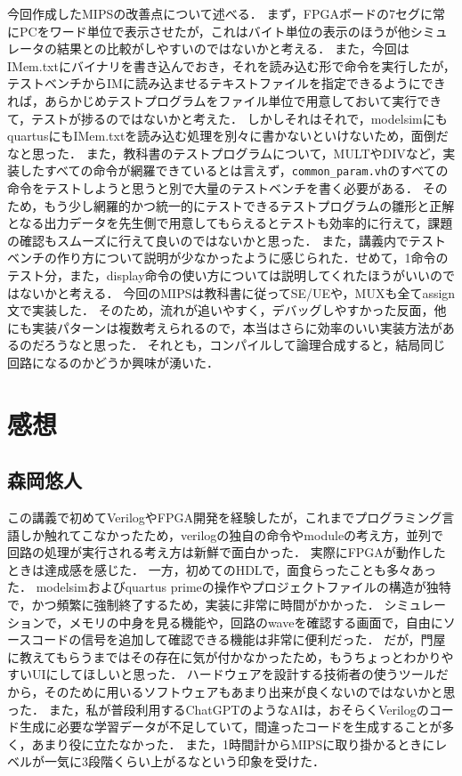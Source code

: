 \documentclass[dvipdfmx]{jsarticle}
\begin{document}
今回作成したMIPSの改善点について述べる．
まず，FPGAボードの7セグに常にPCをワード単位で表示させたが，これはバイト単位の表示のほうが他シミュレータの結果との比較がしやすいのではないかと考える．
また，今回はIMem.txtにバイナリを書き込んでおき，それを読み込む形で命令を実行したが，テストベンチからIMに読み込ませるテキストファイルを指定できるようにできれば，あらかじめテストプログラムをファイル単位で用意しておいて実行できて，テストが捗るのではないかと考えた．
しかしそれはそれで，modelsimにもquartusにもIMem.txtを読み込む処理を別々に書かないといけないため，面倒だなと思った．
また，教科書のテストプログラムについて，MULTやDIVなど，実装したすべての命令が網羅できているとは言えず，\texttt{common_param.vh}のすべての命令をテストしようと思うと別で大量のテストベンチを書く必要がある．
そのため，もう少し網羅的かつ統一的にテストできるテストプログラムの雛形と正解となる出力データを先生側で用意してもらえるとテストも効率的に行えて，課題の確認もスムーズに行えて良いのではないかと思った．
また，講義内でテストベンチの作り方について説明が少なかったように感じられた．せめて，1命令のテスト分，また，display命令の使い方については説明してくれたほうがいいのではないかと考える．
今回のMIPSは教科書に従ってSE/UEや，MUXも全てassign文で実装した．
そのため，流れが追いやすく，デバッグしやすかった反面，他にも実装パターンは複数考えられるので，本当はさらに効率のいい実装方法があるのだろうなと思った．
それとも，コンパイルして論理合成すると，結局同じ回路になるのかどうか興味が湧いた．





\section{感想}
\subsection{森岡悠人}
この講義で初めてVerilogやFPGA開発を経験したが，これまでプログラミング言語しか触れてこなかったため，verilogの独自の命令やmoduleの考え方，並列で回路の処理が実行される考え方は新鮮で面白かった．
実際にFPGAが動作したときは達成感を感じた．
一方，初めてのHDLで，面食らったことも多々あった．
modelsimおよびquartus primeの操作やプロジェクトファイルの構造が独特で，かつ頻繁に強制終了するため，実装に非常に時間がかかった．
シミュレーションで，メモリの中身を見る機能や，回路のwaveを確認する画面で，自由にソースコードの信号を追加して確認できる機能は非常に便利だった．
だが，門屋に教えてもらうまではその存在に気が付かなかったため，もうちょっとわかりやすいUIにしてほしいと思った．
ハードウェアを設計する技術者の使うツールだから，そのために用いるソフトウェアもあまり出来が良くないのではないかと思った．
また，私が普段利用するChatGPTのようなAIは，おそらくVerilogのコード生成に必要な学習データが不足していて，間違ったコードを生成することが多く，あまり役に立たなかった．
また，1時間計からMIPSに取り掛かるときにレベルが一気に3段階くらい上がるなという印象を受けた．
\end{document}
